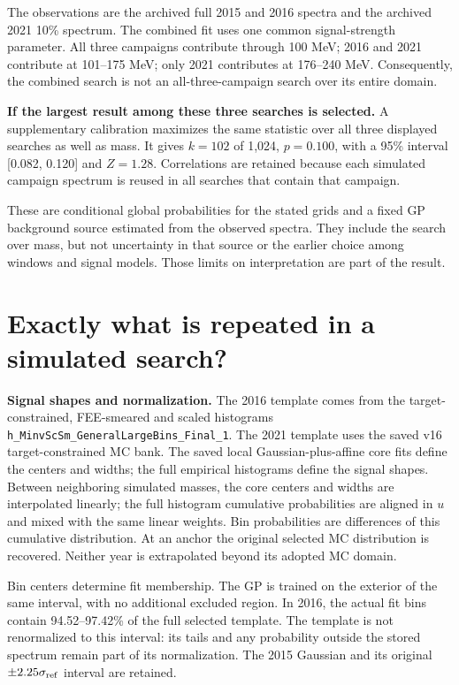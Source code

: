 \documentclass[11pt]{article}
\begin{document}
The observations are the archived full 2015 and 2016 spectra and the archived 2021 10\% spectrum. The combined fit uses one common signal-strength parameter. All three campaigns contribute through 100 MeV; 2016 and 2021 contribute at 101--175 MeV; only 2021 contributes at 176--240 MeV. Consequently, the combined search is not an all-three-campaign search over its entire domain.

\textbf{If the largest result among these three searches is selected.} A supplementary calibration maximizes the same statistic over all three displayed searches as well as mass. It gives $k=102$ of 1,024, $p=0.100$, with a 95\% interval [0.082, 0.120] and $Z=1.28$. Correlations are retained because each simulated campaign spectrum is reused in all searches that contain that campaign.

These are conditional global probabilities for the stated grids and a fixed GP background source estimated from the observed spectra. They include the search over mass, but not uncertainty in that source or the earlier choice among windows and signal models. Those limits on interpretation are part of the result.

\clearpage\section*{Exactly what is repeated in a simulated search?}

\textbf{Signal shapes and normalization.} The 2016 template comes from the target-constrained, FEE-smeared and scaled histograms \texttt{h\_MinvScSm\_GeneralLargeBins\_Final\_1}. The 2021 template uses the saved v16 target-constrained MC bank. The saved local Gaussian-plus-affine core fits define the centers and widths; the full empirical histograms define the signal shapes. Between neighboring simulated masses, the core centers and widths are interpolated linearly; the full histogram cumulative probabilities are aligned in $u$ and mixed with the same linear weights. Bin probabilities are differences of this cumulative distribution. At an anchor the original selected MC distribution is recovered. Neither year is extrapolated beyond its adopted MC domain.

Bin centers determine fit membership. The GP is trained on the exterior of the same interval, with no additional excluded region. In 2016, the actual fit bins contain 94.52--97.42\% of the full selected template. The template is not renormalized to this interval: its tails and any probability outside the stored spectrum remain part of its normalization. The 2015 Gaussian and its original $\pm2.25\sigma_{\rm ref}$ interval are retained.
\end{document}
